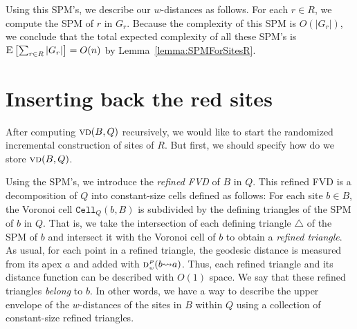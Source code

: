 \documentclass[a4paper,UKenglish]{socg-lipics-v2018}
\newcommand{\s}{\mathcal S}
\newcommand{\dd}[3][P]{\ensuremath{\textsc{d}_{\scriptscriptstyle w}^{\scriptscriptstyle #1}(#2 {\leadsto} #3)}}
\newcommand{\p}[3][P]{\ensuremath{\pi_{_{#1}}(#2, #3)}}
\newcommand{\cell}[2][P]{\ensuremath{\mathtt{Cell}_{\scriptscriptstyle #1}(#2)}}
\newcommand{\vd}[2][P]{\textsc{vd}(#2, #1)}
\newcommand{\ex}[1]{\textsc{E}\left[#1\right]}
\begin{document}
Using this SPM's, we describe our $w$-distances as follows.
For each $r\in R$, we compute the SPM of $r$ in $G_r$.
Because the complexity of this SPM is $O(|G_r|)$, we conclude that the total expected complexity of all these SPM's is $\ex{\sum_{r\in R} |G_r|} = O(n)$ by Lemma~\ref{lemma:SPMForSitesR}.


\section{Inserting back the red sites}\label{section: Insertion process}

After computing $\vd[Q]{B}$ recursively, we would like to start the randomized incremental construction of sites of $R$. 
But first, we should specify how do we store $\vd[Q]{B}$. 


Using the SPM's, we introduce the \emph{refined FVD} of $B$ in $Q$.
This refined FVD is a decomposition of $Q$ into constant-size cells defined as follows:
For each site $b\in B$, the Voronoi cell $\cell[Q]{b, B}$ is subdivided by the defining triangles of the SPM of $b$ in $Q$. 
That is, we take the intersection of each defining triangle $\triangle$ of the SPM of $b$ and intersect it with the Voronoi cell of $b$ to obtain a \emph{refined triangle}. 
As usual, for each point in a refined triangle, the geodesic distance is measured from its apex $a$ and added with $\dd{b}{a}$. 
Thus, each refined triangle and its distance function can be described with $O(1)$ space. We say that these refined triangles \emph{belong} to $b$. 
In other words, we have a way to describe the upper envelope of the $w$-distances of the sites in $B$ within $Q$ using a collection of constant-size refined triangles. 
\end{document}
